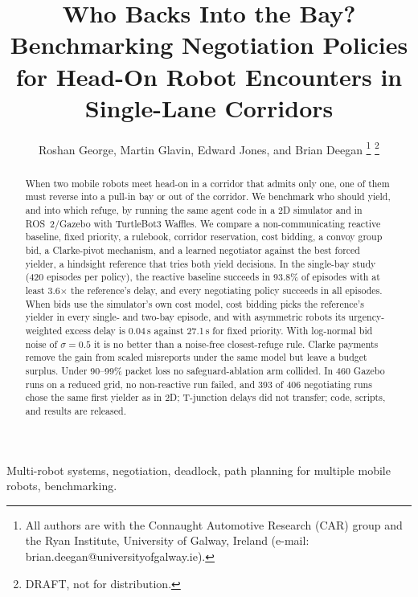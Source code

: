 \documentclass[letterpaper,journal]{IEEEtran}
\begin{document}
\title{Who Backs Into the Bay? Benchmarking Negotiation Policies for Head-On Robot Encounters in Single-Lane Corridors}
\author{Roshan George, Martin Glavin, Edward Jones, and Brian Deegan%
\thanks{All authors are with the Connaught Automotive Research (CAR) group and the Ryan Institute, University of Galway, Ireland (e-mail: brian.deegan@universityofgalway.ie).}%
\thanks{DRAFT, not for distribution.}}
\maketitle

\begin{abstract}
When two mobile robots meet head-on in a corridor that admits only one, one of them must reverse into a pull-in bay or out of the corridor. We benchmark who should yield, and into which refuge, by running the same agent code in a 2D simulator and in ROS~2/Gazebo with TurtleBot3 Waffles. We compare a non-communicating reactive baseline, fixed priority, a rulebook, corridor reservation, cost bidding, a convoy group bid, a Clarke-pivot mechanism, and a learned negotiator against the best forced yielder, a hindsight reference that tries both yield decisions. In the single-bay study (420 episodes per policy), the reactive baseline succeeds in 93.8\% of episodes with at least 3.6$\times$ the reference's delay, and every negotiating policy succeeds in all episodes. When bids use the simulator's own cost model, cost bidding picks the reference's yielder in every single- and two-bay episode, and with asymmetric robots its urgency-weighted excess delay is 0.04\,s against 27.1\,s for fixed priority. With log-normal bid noise of $\sigma=0.5$ it is no better than a noise-free closest-refuge rule. Clarke payments remove the gain from scaled misreports under the same model but leave a budget surplus. Under 90--99\% packet loss no safeguard-ablation arm collided. In 460 Gazebo runs on a reduced grid, no non-reactive run failed, and 393 of 406 negotiating runs chose the same first yielder as in 2D; T-junction delays did not transfer; code, scripts, and results are released.
\end{abstract}

\begin{IEEEkeywords}
Multi-robot systems, negotiation, deadlock, path planning for multiple mobile robots, benchmarking.
\end{IEEEkeywords}
\end{document}
